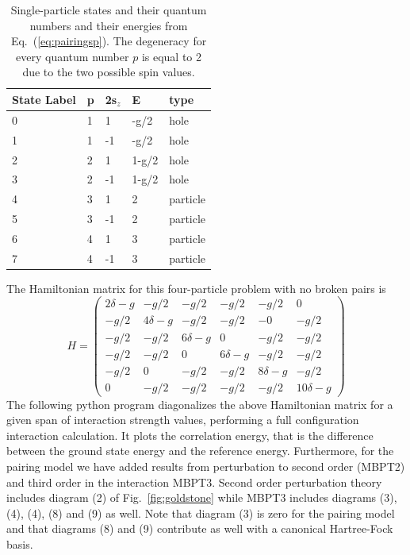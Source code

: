 \begin{table}
\caption{Single-particle states and their quantum numbers and their energies from Eq.~(\ref{eq:pairingsp}). The degeneracy for every quantum number $p$ is equal to 2 due to the two possible spin values.} \label{tab:pairingmodelsp}
  \begin{center}
      \begin{tabular}{| l | l | l | l | l |}
      \hline State Label & p & 2s$_z$ & E & type\\ \hline 0 & 1 & 1 &
      -g/2 & hole \\ \hline 1 & 1 & -1 & -g/2 & hole \\ \hline 2 & 2 &
      1 & 1-g/2 & hole \\ \hline 3 & 2 & -1 & 1-g/2 & hole \\ \hline 4
      & 3 & 1 & 2 & particle \\ \hline 5 & 3 & -1 & 2 & particle
      \\ \hline 6 & 4 & 1 & 3 & particle \\ \hline 7 & 4 & -1 & 3 &
      particle \\ \hline
      \end{tabular}
  \end{center}
\end{table}
The Hamiltonian matrix for this   four-particle problem with no broken pairs is 
  \[
  H = \left (
  \begin{array}{cccccc}
  2\delta -g & -g/2 & -g/2 & -g/2 & -g/2 & 0 \\ -g/2 & 4\delta -g &
  -g/2 & -g/2 & -0 & -g/2 \\ -g/2 & -g/2 & 6\delta -g & 0 & -g/2 &
  -g/2 \\ -g/2 & -g/2 & 0 & 6\delta-g & -g/2 & -g/2 \\ -g/2 & 0 & -g/2
  & -g/2 & 8\delta-g & -g/2 \\ 0 & -g/2 & -g/2 & -g/2 & -g/2 &
  10\delta -g
  \end{array} \right )
  \]
  The following python program diagonalizes the above Hamiltonian
  matrix for a given span of interaction strength values, performing
  a full configuration interaction calculation. It plots the correlation energy, that is the difference between the ground state energy and the reference energy. Furthermore, for the pairing model we have added results from perturbation to second order (MBPT2)
and third order in the interaction MBPT3. Second order perturbation theory includes diagram (2) of Fig.~\ref{fig:goldstone}
while MBPT3 includes diagrams (3), (4), (4), (8) and (9) as well. Note that diagram (3) is zero for the pairing model and that diagrams (8) and (9) contribute as well with a canonical Hartree-Fock basis. 
